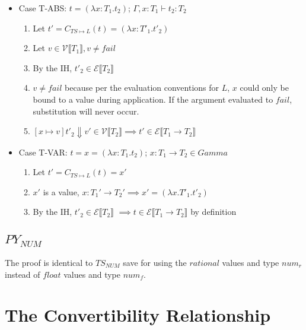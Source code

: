 \documentclass{article}
\newcommand{\denoteset}[2]{\mathcal{#1} \llbracket #2 \rrbracket}
\begin{document}
	\begin{itemize}
		\item Case T-ABS: $t = (\lambda x: T_1.t_2)$; $\Gamma, x: T_1 \vdash t_2: T_2$
		\begin{enumerate}
			\item Let $t' = C_{TS \mapsto L}(t) = (\lambda x: T'_1.t'_2)$
			\item Let $v \in \denoteset{V}{T_1}, v \neq fail$
			\item By the IH, $t'_2 \in \denoteset{E}{T_2}$
			\item $v \neq fail$ because per the evaluation conventions for $L$, $x$ could only be bound to a value during application. If the argument evaluated to $fail$, substitution will never occur.
			\item $[x \mapsto v]t'_2 \Downarrow v' \in \denoteset{V}{T_2} \implies t' \in \denoteset{E}{T_1 \rightarrow T_2}$
		\end{enumerate}
	
		\item Case T-VAR: $t = x = (\lambda x: T_1.t_2)$; $x: T_1 \rightarrow T_2 \in Gamma$
		\begin{enumerate}
			\item Let $t' = C_{TS \mapsto L}(t) = x'$
			\item $x'$ is a value, $x: T_1' \rightarrow T_2' \implies x' = (\lambda x. T'_1. t'_2)$
			\item By the IH, $t'_2 \in \denoteset{E}{T_2}$ $\implies t \in \denoteset{E}{T_1 \rightarrow T_2}$ by definition
		\end{enumerate}
	\end{itemize}

	\subsection{$PY_{NUM}$}
	
	The proof is identical to $TS_{NUM}$ save for using the $rational$ values and type $num_r$ instead of $float$ values and type $num_f$.

	\section{The Convertibility Relationship}
	
\end{document}
